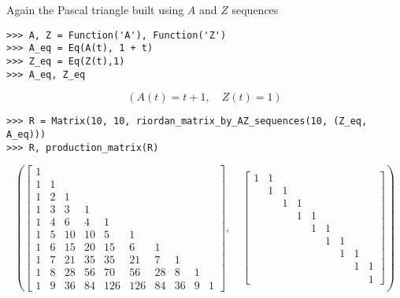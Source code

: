 \begin{example}
Again the Pascal triangle built using $A$ and $Z$ sequences
\begin{verbatim}
>>> A, Z = Function('A'), Function('Z')
>>> A_eq = Eq(A(t), 1 + t)
>>> Z_eq = Eq(Z(t),1)
>>> A_eq, Z_eq
\end{verbatim}
\begin{displaymath}
\left ( A{\left (t \right )} = t + 1, \quad Z{\left (t \right )} = 1\right )
\end{displaymath}
\begin{verbatim}
>>> R = Matrix(10, 10, riordan_matrix_by_AZ_sequences(10, (Z_eq, A_eq)))
>>> R, production_matrix(R)
\end{verbatim}
\begin{displaymath}
\left ( \left[\begin{matrix}1 &   &   &   &   &   &   &   &   &  \\1 & 1 &   &   &   &   &   &   &   &  \\1 & 2 & 1 &   &   &   &   &   &   &  \\1 & 3 & 3 & 1 &   &   &   &   &   &  \\1 & 4 & 6 & 4 & 1 &   &   &   &   &  \\1 & 5 & 10 & 10 & 5 & 1 &   &   &   &  \\1 & 6 & 15 & 20 & 15 & 6 & 1 &   &   &  \\1 & 7 & 21 & 35 & 35 & 21 & 7 & 1 &   &  \\1 & 8 & 28 & 56 & 70 & 56 & 28 & 8 & 1 &  \\1 & 9 & 36 & 84 & 126 & 126 & 84 & 36 & 9 & 1\end{matrix}\right], \quad \left[\begin{matrix}1 & 1 &   &   &   &   &   &   &  \\  & 1 & 1 &   &   &   &   &   &  \\  &   & 1 & 1 &   &   &   &   &  \\  &   &   & 1 & 1 &   &   &   &  \\  &   &   &   & 1 & 1 &   &   &  \\  &   &   &   &   & 1 & 1 &   &  \\  &   &   &   &   &   & 1 & 1 &  \\  &   &   &   &   &   &   & 1 & 1\\  &   &   &   &   &   &   &   & 1\end{matrix}\right]\right )
\end{displaymath}
\end{example}

